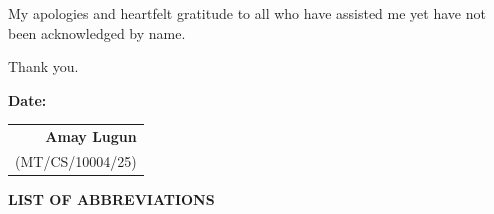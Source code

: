 \documentclass[a4paper,12pt]{report}
\newcommand{\authorname}{Amay Lugun}
\newcommand{\rollnumber}{MT/CS/10004/25}
\begin{document}
    \noindent
    My apologies and heartfelt gratitude to all who have assisted me yet have not been acknowledged by name.

    \vspace{0.9cm}

    \noindent Thank you.

    \vspace{1.8cm}

    \noindent
    \textbf{Date:}\hfill
    \begin{tabular}{@{}r@{}}
        \textbf{\authorname}\\[0.15cm]
        (\rollnumber)
    \end{tabular}
\endgroup

\clearpage
{\hypersetup{linkcolor=black}\tableofcontents}

\clearpage
\begingroup
{}
{}
{\hypersetup{linkcolor=black}\listoffigures}

\vspace{0.8cm}
\makeatletter
\let\clearpage\relax
\let\newpage\relax
{}
{}
{\hypersetup{linkcolor=black}\listoftables}
\makeatother
\endgroup

\clearpage
{}
{}
\begingroup
    \fontsize{12}{16}\selectfont

    \vspace*{0.5cm}
    {\fontsize{18}{22}\selectfont\bfseries LIST OF ABBREVIATIONS\par}

    \vspace{0.8cm}
\end{document}
